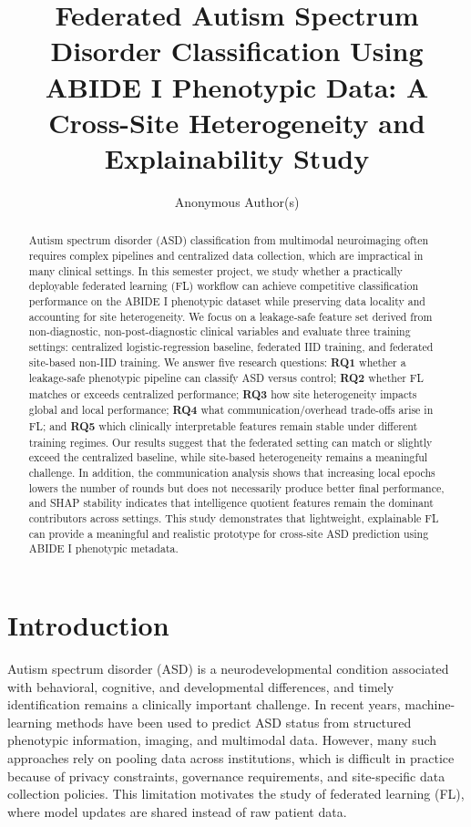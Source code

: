 \documentclass[sigconf]{acmart}
\title{Federated Autism Spectrum Disorder Classification Using ABIDE I Phenotypic Data: A Cross-Site Heterogeneity and Explainability Study}
\author{Anonymous Author(s)}
\affiliation{\institution{Semester Project / Research Mini-Project}}
\begin{document}
\begin{abstract}
Autism spectrum disorder (ASD) classification from multimodal neuroimaging often requires complex pipelines and centralized data collection, which are impractical in many clinical settings. In this semester project, we study whether a practically deployable federated learning (FL) workflow can achieve competitive classification performance on the ABIDE I phenotypic dataset while preserving data locality and accounting for site heterogeneity. We focus on a leakage-safe feature set derived from non-diagnostic, non-post-diagnostic clinical variables and evaluate three training settings: centralized logistic-regression baseline, federated IID training, and federated site-based non-IID training. We answer five research questions: \textbf{RQ1} whether a leakage-safe phenotypic pipeline can classify ASD versus control; \textbf{RQ2} whether FL matches or exceeds centralized performance; \textbf{RQ3} how site heterogeneity impacts global and local performance; \textbf{RQ4} what communication/overhead trade-offs arise in FL; and \textbf{RQ5} which clinically interpretable features remain stable under different training regimes. Our results suggest that the federated setting can match or slightly exceed the centralized baseline, while site-based heterogeneity remains a meaningful challenge. In addition, the communication analysis shows that increasing local epochs lowers the number of rounds but does not necessarily produce better final performance, and SHAP stability indicates that intelligence quotient features remain the dominant contributors across settings. This study demonstrates that lightweight, explainable FL can provide a meaningful and realistic prototype for cross-site ASD prediction using ABIDE I phenotypic metadata.
\end{abstract}

\maketitle

\section{Introduction}
Autism spectrum disorder (ASD) is a neurodevelopmental condition associated with behavioral, cognitive, and developmental differences, and timely identification remains a clinically important challenge. In recent years, machine-learning methods have been used to predict ASD status from structured phenotypic information, imaging, and multimodal data. However, many such approaches rely on pooling data across institutions, which is difficult in practice because of privacy constraints, governance requirements, and site-specific data collection policies. This limitation motivates the study of federated learning (FL), where model updates are shared instead of raw patient data.
\end{document}
